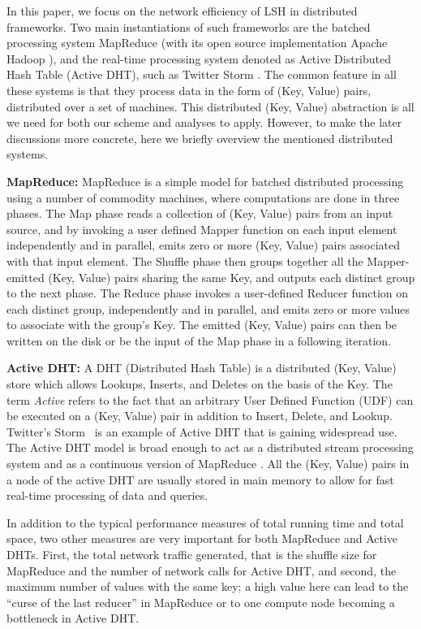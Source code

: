 \documentclass{acm_proc_article-sp}
\numberwithin{equation}{section}
\numberwithin{figure}{section}
\begin{document}
In this paper, we focus on the network efficiency of LSH in distributed frameworks. Two main instantiations of such frameworks are the batched processing system MapReduce \cite{mapreduce} (with its open source implementation Apache Hadoop \cite{Hadoop}), and the real-time processing system denoted as Active Distributed Hash Table (Active DHT), such as Twitter Storm \cite{Storm}. The common feature in all these systems is that they process data in the form of (Key, Value) pairs, distributed over a set of machines. This distributed (Key, Value) abstraction is all we need for both our scheme and analyses to apply. However, to make the later discussions more concrete, here we briefly overview the mentioned distributed systems.

\noindent \textbf{MapReduce:} MapReduce \cite{mapreduce} is a simple model for batched distributed processing using a number of commodity machines, where computations are done in three phases. The Map phase reads a collection of (Key, Value) pairs from an input source, and by invoking a user defined Mapper function on each input element independently and in parallel, emits zero or more (Key, Value) pairs associated with that input element. The Shuffle phase then groups together all the Mapper-emitted (Key, Value) pairs sharing the same Key, and outputs each distinct group to the next phase. The Reduce phase invokes a user-defined Reducer function on each distinct group, independently and in parallel, and emits zero or more values to associate with the group's Key. The emitted (Key, Value) pairs can then be written on the disk or be the input of the Map phase in a following iteration. 


\noindent \textbf{Active DHT:} A DHT (Distributed Hash Table) is a distributed (Key, Value) store which allows Lookups, Inserts, and Deletes on the basis of the Key. The term {\em Active} refers to the fact that an arbitrary User Defined Function (UDF) can be executed on a (Key, Value) pair in addition to Insert, Delete, and Lookup. Twitter's Storm~\cite{Storm} is an example of Active DHT that is gaining widespread use. The Active DHT model is broad enough to act as a distributed stream processing system and as a continuous version of MapReduce \cite{OnePassMR}. All the (Key, Value) pairs in a node of the active DHT are usually stored in main memory to allow for fast real-time processing of data and queries. 

In addition to the typical performance measures of total running time and total space, two other measures are very important for both MapReduce and Active DHTs. First, the total network traffic generated, that is the shuffle size for MapReduce and the number of network calls for Active DHT, and second, the maximum number of values with the same key; a high value here can lead to the ``curse of the last reducer'' in MapReduce \cite{curselast} or to one compute node becoming a bottleneck in Active DHT. 
\end{document}
